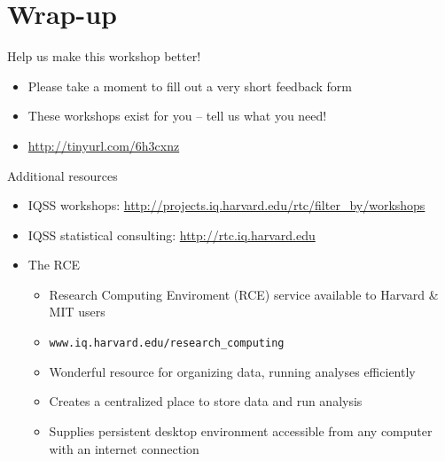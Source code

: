 \documentclass[table,smaller]{beamer}
\begin{document}
\section{Wrap-up}
\label{sec-5}

\begin{frame}[label=sec-5-1]{Help us make this workshop better!}
\begin{itemize}
\item Please take a moment to fill out a very short feedback form

\item These workshops exist for you – tell us what you need!

\item \url{http://tinyurl.com/6h3cxnz}
\end{itemize}
\end{frame}


\begin{frame}[label=sec-5-2]{Additional resources}
\begin{itemize}
\item IQSS workshops: \url{http://projects.iq.harvard.edu/rtc/filter_by/workshops}

\item IQSS statistical consulting: \url{http://rtc.iq.harvard.edu}

\item The RCE
\begin{itemize}
\item Research Computing Enviroment (RCE) service available to Harvard \& MIT users
\item \texttt{www.iq.harvard.edu/research\_computing}
\item Wonderful resource for organizing data, running analyses efficiently
\item Creates a centralized place to store data and run analysis
\item Supplies persistent desktop environment accessible from any computer with an internet connection
\end{itemize}
\end{itemize}
\end{frame}
\end{document}
